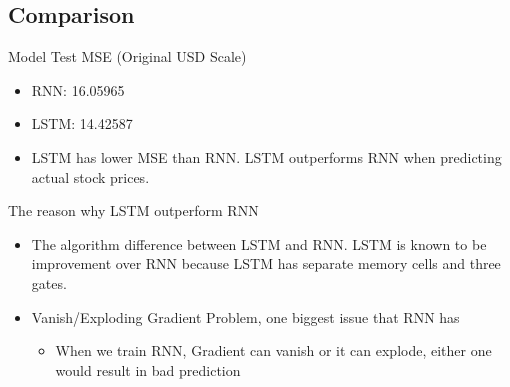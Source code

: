 \documentclass[
]{article}
\providecommand{\tightlist}{%
  \setlength{\itemsep}{0pt}\setlength{\parskip}{0pt}}
\begin{document}
\subsection{Comparison}\label{comparison-1}

Model Test MSE (Original USD Scale)

\begin{itemize}
\item
  RNN: 16.05965
\item
  LSTM: 14.42587
\item
  LSTM has lower MSE than RNN. LSTM outperforms RNN when predicting
  actual stock prices.
\end{itemize}

The reason why LSTM outperform RNN

\begin{itemize}
\item
  The algorithm difference between LSTM and RNN. LSTM is known to be
  improvement over RNN because LSTM has separate memory cells and three
  gates.
\item
  Vanish/Exploding Gradient Problem, one biggest issue that RNN has

  \begin{itemize}
  \tightlist
  \item
    When we train RNN, Gradient can vanish or it can explode, either one
    would result in bad prediction
  \end{itemize}
\end{itemize}
\end{document}

